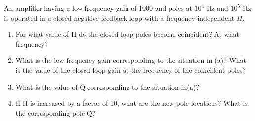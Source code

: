 An amplifier having a low-frequency gain of 1000 and poles at $10^4$ Hz and $10^5$ Hz is operated in a closed negative-feedback loop with a frequency-independent $H$.  
\begin{enumerate}[label=\alph*.]
\item  For what value of H do the closed-loop poles become coincident? At what frequency?\\
\item  What is the low-frequency gain corresponding to the situation in (a)? What is the value of the closed-loop gain at the frequency of the coincident poles?\\
\item  What is the value of Q corresponding to the situation in(a)?\\
\item If H is increased by a factor of 10, what are the new pole locations? What is the corresponding pole Q?
\end{enumerate}
